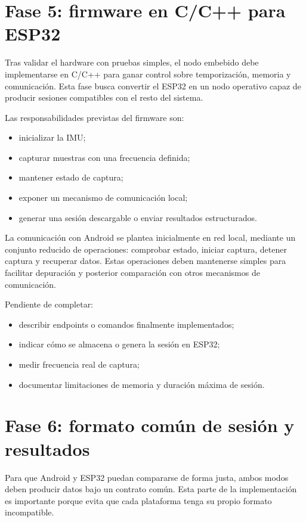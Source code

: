 \section{Fase 5: firmware en C/C++ para ESP32}

Tras validar el hardware con pruebas simples, el nodo embebido debe implementarse en C/C++ para ganar control sobre temporización, memoria y comunicación. Esta fase busca convertir el ESP32 en un nodo operativo capaz de producir sesiones compatibles con el resto del sistema.

Las responsabilidades previstas del firmware son:

\begin{itemize}
  \item inicializar la IMU;
  \item capturar muestras con una frecuencia definida;
  \item mantener estado de captura;
  \item exponer un mecanismo de comunicación local;
  \item generar una sesión descargable o enviar resultados estructurados.
\end{itemize}

La comunicación con Android se plantea inicialmente en red local, mediante un conjunto reducido de operaciones: comprobar estado, iniciar captura, detener captura y recuperar datos. Estas operaciones deben mantenerse simples para facilitar depuración y posterior comparación con otros mecanismos de comunicación.

\begin{temporalblock}
Pendiente de completar:
\begin{itemize}
  \item describir endpoints o comandos finalmente implementados;
  \item indicar cómo se almacena o genera la sesión en ESP32;
  \item medir frecuencia real de captura;
  \item documentar limitaciones de memoria y duración máxima de sesión.
\end{itemize}
\end{temporalblock}

\section{Fase 6: formato común de sesión y resultados}

Para que Android y ESP32 puedan compararse de forma justa, ambos modos deben producir datos bajo un contrato común. Esta parte de la implementación es importante porque evita que cada plataforma tenga su propio formato incompatible.

